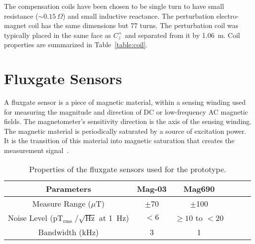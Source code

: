 The compensation coils have been chosen to be single turn to have small resistance ($\sim0.15~\Omega$) and small inductive reactance. The perturbation electro-magnet coil has the same dimensions but 77 turns. The perturbation coil was typically placed in the same face as $C_z^+$ and separated from it by 1.06~m. Coil properties are summarized in Table~\ref{table:coil}. 




\section{Fluxgate Sensors}\label{sec:sensor}

A fluxgate sensor is a piece of magnetic material, within a sensing winding used for measuring the magnitude and direction of DC or low-frequency AC magnetic fields. The magnetometer's sensitivity direction is the axis of the sensing winding. The magnetic material is periodically saturated by a source of excitation power. It is the transition of this material into magnetic saturation that creates the measurement signal~\cite{flux1,flux_sense}.


\begin{table} [!htb]
    \centering
    \begin{tabular} { |c|c|c|c|c|c|} 
        \hline
        Parameters & Mag-03 & Mag690 \\
        \hline\hline
        Measure Range ($\mu$T) & $\pm$70 & $\pm$100 \\ 
        \hline
        \makecell{Noise Level \\($\mathrm{pT_{rms}\;/\sqrt{Hz}}$ at 1~Hz)} & $<6$ & $\geq10$ to $<20$ \\ 
        \hline
        Bandwidth (kHz) & 3 & 1 \\ 
        \hline

    \end{tabular}
    \caption{Properties of the fluxgate sensors used for the prototype.}\label{table:sensor}
\end{table}

